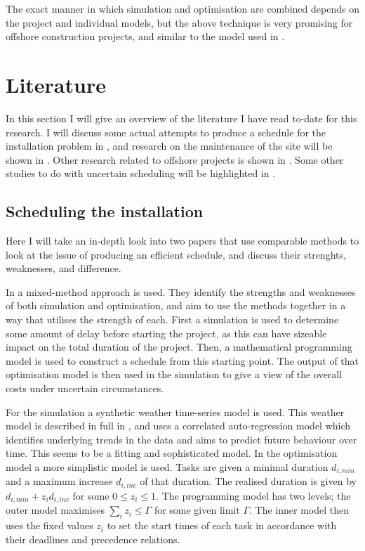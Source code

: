 \documentclass[a4paper,12pt]{article}
\begin{document}
The exact manner in which simulation and optimisation are combined depends on the project and individual models, but the above technique is very promising for offshore construction projects, and similar to the model used in \cite{kerkhove2017optimised}. 

\pagebreak

\section{Literature} \label{s:lit}
In this section I will give an overview of the literature I have read to-date for this research. I will discuss some actual attempts to produce a schedule for the installation problem in , and research on the maintenance of the site will be shown in . Other research related to offshore projects is shown in . Some other studies to do with uncertain scheduling will be highlighted in .  

\subsection{Scheduling the installation} \label{ss:sched}
Here I will take an in-depth look into two papers that use comparable methods to look at the issue of producing an efficient schedule, and discuss their strenghts, weaknesses, and difference.

\bigskip

In \cite{barlow2018mixed} a mixed-method approach is used. They identify the strengths and weaknesses of both simulation and optimisation, and aim to use the methods together in a way that utilises the strength of each. First a simulation is used to determine some amount of delay before starting the project, as this can have sizeable impact on the total duration of the project. Then, a mathematical programming model is used to construct a schedule from this starting point. The output of that optimisation model is then used in the simulation to give a view of the overall costs under uncertain circumstances. 

For the simulation a synthetic weather time-series model is used. This weather model is described in full in \cite{dinwoodie2014operational} , and uses a correlated auto-regression model which identifies underlying trends in the data and aims to predict future behaviour over time. This seems to be a fitting and sophisticated model. In the optimisation model a more simplistic model is used. Tasks are given a minimal duration $d_{i, min}$ and a maximum increase $d_{i, inc}$ of that duration. The realised duration is given by $d_{i,  min} + z_i d_{i, inc}$ for some $0 \leq z_i \leq 1$. The programming model has two levels; the outer model maximises $\sum_i z_i \leq \Gamma$ for some given limit $\Gamma$. The inner model then uses the fixed values $z_i$ to set the start times of each task in accordance with their deadlines and precedence relations. 
\end{document}
